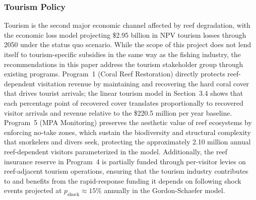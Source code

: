 \documentclass[10pt,letterpaper]{article}
\begin{document}
\subsubsection{Tourism Policy}

Tourism is the second major economic channel affected by reef degradation, with the economic loss model
projecting \$2.95 billion in NPV tourism losses through 2050 under the status quo scenario. While the
scope of this project does not lend itself to tourism-specific subsidies in the same way as the fishing
industry, the recommendations in this paper address the tourism stakeholder group through existing
programs. Program~1 (Coral Reef Restoration) directly protects reef-dependent visitation revenue by
maintaining and recovering the hard coral cover that drives tourist arrivals; the linear tourism model
in Section~3.4 shows that each percentage point of recovered cover translates proportionally to
recovered visitor arrivals and revenue relative to the \$220.5 million per year baseline. Program~5
(MPA Monitoring) preserves the aesthetic value of reef ecosystems by enforcing no-take zones, which
sustain the biodiversity and structural complexity that snorkelers and divers seek, protecting the
approximately 2.10 million annual reef-dependent visitors parameterized in the model. Additionally,
the reef insurance reserve in Program~4 is partially funded through per-visitor levies on
reef-adjacent tourism operations, ensuring that the tourism industry contributes to and benefits from
the rapid-response funding it depends on following shock events projected at $p_{\text{shock}} \approx
15\%$ annually in the Gordon-Schaefer model.
\end{document}
